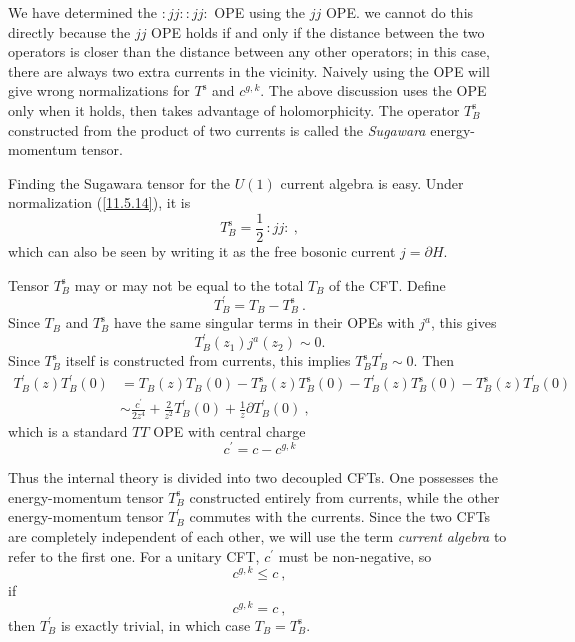 We have determined the $:jj::jj:$ OPE using the $jj$ OPE. we cannot do this directly because the $jj$ OPE holds if and only if the distance between the two operators is closer than the distance between any other operators; in this case, there are always two extra currents in the vicinity. Naively using the OPE will give wrong normalizations for $T^{\mathrm{s}}$ and $c^{g,k}$. The above discussion uses the OPE only when it holds, then takes advantage of holomorphicity. The operator $T_{B}^{\mathrm{s}}$ constructed from the product of two currents is called the \emph{Sugawara} energy-momentum tensor.

Finding the Sugawara tensor for the $U(1)$ current algebra is easy. Under normalization (\ref{11.5.14}), it is
\begin{equation}
	T_{B}^{\mathrm{s}} =\frac{1}{2}\,:jj: \:, \label{11.5.27}
\end{equation}
which can also be seen by writing it as the free bosonic current $j=\partial H$. 

Tensor $T_{B}^{\mathrm{s}}$ may or may not be equal to the total $T_{B}$ of the CFT. Define
\begin{equation}
	T_{B}^{\prime} = T_{B} - T_{B}^{\mathrm{s}} \:. \label{11.5.28}
\end{equation}
Since $T_{B}$ and $T_{B}^{\mathrm{s}}$ have the same singular terms in their OPEs with $j^{a}$, this gives
\begin{equation}
	T_{B}^{\prime}(z_{1})j^{a}(z_{2})\sim 0 . \label{11.5.29}
\end{equation}
Since $T_{B}^{\mathrm{s}}$ itself is constructed from currents, this implies $T_{B}^{\mathrm{s}}T_{B}^{\prime}\sim 0$. Then
\begin{align}
	T_{B}^{\prime}(z)T_{B}^{\prime}(0) &= T_{B}(z)T_{B}(0)-T_{B}^{\mathrm{s}}(z)T_{B}^{\mathrm{s}}(0)
	-T_{B}^{\prime}(z)T_{B}^{\mathrm{s}}(0) - T_{B}^{\mathrm{s}}(z)T_{B}^{\prime}(0) \nonumber \\
	&\sim \frac{c^{\prime}}{2z^{4}}+\frac{2}{z^{2}}T_{B}^{\prime}(0) +\frac{1}{z}\partial T_{B}^{\prime}(0)\:,
	\label{11.5.30}
\end{align}
which is a standard $TT$ OPE with central charge
\begin{equation}
	c^{\prime}=c-c^{g,k} \label{11.5.31}
\end{equation}

Thus the internal theory is divided into two decoupled CFTs. One possesses the energy-momentum tensor $T_{B}^{\mathrm{s}}$ constructed entirely from currents, while the other energy-momentum tensor $T_{B}^{\prime}$ commutes with the currents. Since the two CFTs are completely independent of each other, we will use the term \emph{current algebra} to refer to the first one. For a unitary CFT, $c^{\prime}$ must be non-negative, so
\begin{equation}
	c^{g,k}\leq c \:, \label{11.5.32}
\end{equation}
if
\begin{equation}
	c^{g,k}=c \:, \label{11.5.33}
\end{equation}
then $T_{B}^{\prime}$ is exactly trivial, in which case $T_{B}=T_{B}^{\mathrm{s}}$.

